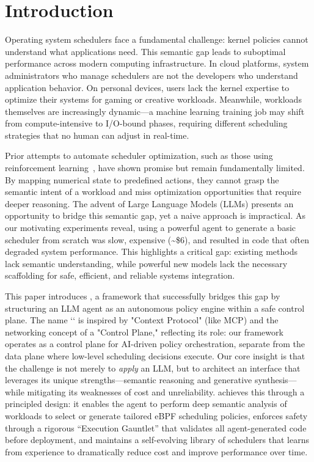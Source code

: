\section{Introduction}
\label{sec:intro}

Operating system schedulers face a fundamental challenge: kernel policies cannot understand what applications need. This semantic gap leads to suboptimal performance across modern computing infrastructure. In cloud platforms, system administrators who manage schedulers are not the developers who understand application behavior. On personal devices, users lack the kernel expertise to optimize their systems for gaming or creative workloads. Meanwhile, workloads themselves are increasingly dynamic—a machine learning training job may shift from compute-intensive to I/O-bound phases, requiring different scheduling strategies that no human can adjust in real-time.

Prior attempts to automate scheduler optimization, such as those using reinforcement learning~\cite{mao2019decima, qiu2020firm}, have shown promise but remain fundamentally limited. By mapping numerical state to predefined actions, they cannot grasp the semantic intent of a workload and miss optimization opportunities that require deeper reasoning. The advent of Large Language Models (LLMs) presents an opportunity to bridge this semantic gap, yet a naive approach is impractical. As our motivating experiments reveal, using a powerful agent to generate a basic scheduler from scratch was slow, expensive (\textasciitilde\$6), and resulted in code that often degraded system performance. This highlights a critical gap: existing methods lack semantic understanding, while powerful new models lack the necessary scaffolding for safe, efficient, and reliable systems integration.

This paper introduces \sys, a framework that successfully bridges this gap by structuring an LLM agent as an autonomous policy engine within a safe control plane. The name `\sys` is inspired by "Context Protocol" (like MCP) and the networking concept of a "Control Plane," reflecting its role: our framework operates as a control plane for AI-driven policy orchestration, separate from the data plane where low-level scheduling decisions execute. Our core insight is that the challenge is not merely to \emph{apply} an LLM, but to architect an interface that leverages its unique strengths—semantic reasoning and generative synthesis—while mitigating its weaknesses of cost and unreliability. \sys achieves this through a principled design: it enables the agent to perform deep semantic analysis of workloads to select or generate tailored eBPF scheduling policies, enforces safety through a rigorous ``Execution Gauntlet'' that validates all agent-generated code before deployment, and maintains a self-evolving library of schedulers that learns from experience to dramatically reduce cost and improve performance over time.

